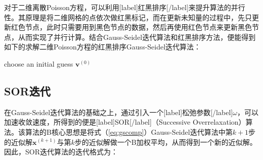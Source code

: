 \documentclass[12pt, UTF8, nofonts]{ctexart}
\begin{document}
对于二维离散Poisson方程，可以利用[label]红黑排序[/label]来提升算法的并行性。其原理是将二维网格的点依次做红黑标记，而在更新未知量的过程中，先只更新红色节点，此时只需要用到黑色节点的数据，然后再使用红色节点来更新黑色节点，从而实现了并行计算。结合Gauss-Seidel迭代算法和红黑排序方法，便能得到如下的求解二维Poisson方程的红黑排序Gauss-Seidel迭代算法：

\begin{algorithm}[H]
    choose an initial guess $\boldsymbol{v}^{(0)}$ \;
\end{algorithm}

\subsection*{SOR迭代}

在Gauss-Seidel迭代算法的基础之上，通过引入一个[label]松弛参数[/label]$\omega$，可以加速收敛速度，所得到的便是[label]SOR[/label]（Successive Overrelaxation）算法。该算法的B核心思想是将式（\ref{eq:gscomp}）Gauss-Seidel迭代算法中第$k+1$步的近似解$\boldsymbol{x}^{(k+1)}$与第$k$步的近似解做一个B加权平均，从而得到一个新的近似解。因此，SOR迭代算法的迭代格式为：
\end{document}
